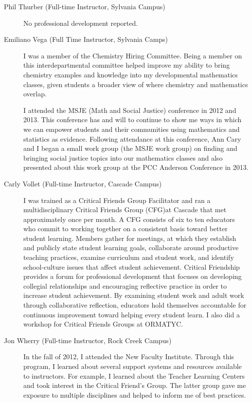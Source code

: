 \begin{description}
	\item[Phil Thurber (Full-time Instructor, Sylvania Campus)]

	No professional development reported.

	\item[Emiliano Vega (Full Time Instructor, Sylvania Camps)]
	I was a member of the Chemistry Hiring Committee. Being a member on this
	interdepartmental committee helped improve my ability to bring chemistry
	examples and knowledge into my developmental mathematics classes, given
	students a broader view of where chemistry and mathematics overlap.

	I attended the MSJE (Math and Social Justice) conference in 2012 and 2013. This
	conference has and will to continue to show me ways in which we can empower
	students and their communities using mathematics and statistics as evidence.
	Following attendance at this conference, Ann Cary and I began a small work
	group (the MSJE work group) on finding and bringing social justice topics into
	our mathematics classes and also presented about this work group at the PCC
	Anderson Conference in 2013.

	\item[Carly Vollet (Full-time Instructor, Cascade Campus)]
	I was trained as a Critical Friends Group Facilitator and ran a
	multidisciplinary Critical Friends Group (CFG)at Cascade that met approximately
	once per month. A CFG consists of six to ten educators who commit to working
	together on a consistent basis toward better student learning. Members gather
	for meetings, at which they establish and publicly state student learning
	goals, collaborate around productive teaching practices, examine curriculum and
	student work, and identify school-culture issues that affect student
	achievement. Critical Friendship provides a forum for professional development
	that focuses on developing collegial relationships and encouraging reflective
	practice in order to increase student achievement.  By examining student work
	and adult work through collaborative reflection, educators hold themselves
	accountable for continuous improvement toward helping every student learn.  I
	also did a workshop for Critical Friends Groups at ORMATYC.

	\item[Jon Wherry (Full-time Instructor, Rock Creek Campus)]
	In the fall of 2012, I attended the New Faculty Institute. Through this
	program, I learned about several support systems and resources available to
	instructors. For example, I learned about the Teacher Learning Centers and took
	interest in the Critical Friend's Group. The latter group gave me exposure to
	multiple disciplines and helped to inform me of best practices.


\end{description}
